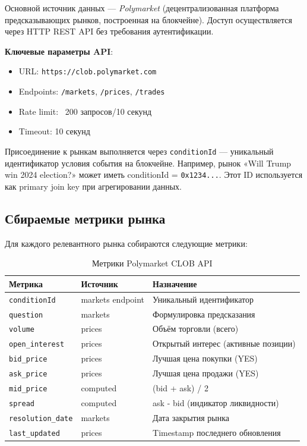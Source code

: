 Основной источник данных --- \emph{Polymarket} (децентрализованная платформа предсказывающих рынков, построенная на блокчейне). Доступ осуществляется через HTTP REST API без требования аутентификации.

\textbf{Ключевые параметры API}:
\begin{itemize}
    \item URL: \texttt{https://clob.polymarket.com}
    \item Endpoints: \texttt{/markets}, \texttt{/prices}, \texttt{/trades}
    \item Rate limit: ~200 запросов/10 секунд
    \item Timeout: 10 секунд
\end{itemize}

Присоединение к рынкам выполняется через \texttt{conditionId} --- уникальный идентификатор условия события на блокчейне. Например, рынок «Will Trump win 2024 election?» может иметь conditionId = \texttt{0x1234...}. Этот ID используется как primary join key при агрегировании данных.


\subsection{Сбираемые метрики рынка}

Для каждого релевантного рынка собираются следующие метрики:

\begin{table}[h!]
\centering
\caption{Метрики Polymarket CLOB API}
\label{tab:polymarket_metrics}
\small
\begin{tabular}{|l|l|l|}
\hline
\textbf{Метрика} & \textbf{Источник} & \textbf{Назначение} \\
\hline
\texttt{conditionId} & markets endpoint & Уникальный идентификатор \\
\texttt{question} & markets & Формулировка предсказания \\
\texttt{volume} & prices & Объём торговли (всего) \\
\texttt{open\_interest} & prices & Открытый интерес (активные позиции) \\
\texttt{bid\_price} & prices & Лучшая цена покупки (YES) \\
\texttt{ask\_price} & prices & Лучшая цена продажи (YES) \\
\texttt{mid\_price} & computed & (bid + ask) / 2 \\
\texttt{spread} & computed & ask - bid (индикатор ликвидности) \\
\texttt{resolution\_date} & markets & Дата закрытия рынка \\
\texttt{last\_updated} & prices & Timestamp последнего обновления \\
\hline
\end{tabular}
\end{table}

